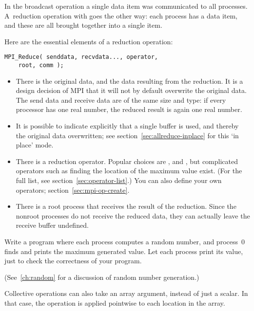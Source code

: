 In the broadcast operation a single data item was communicated to all
processes. A~reduction operation with
%
%
goes the other way: each process has a
data item, and these are all brought together into a single item.

Here are the essential elements of a reduction operation:
\begin{lstlisting}
MPI_Reduce( senddata, recvdata..., operator,
    root, comm ); 
\end{lstlisting}
\begin{itemize}
\item There is the original data, and the data resulting from the
  reduction. It is a design decision of MPI that it will not by
  default overwrite the original data. The send data and receive data
  are of the same size and type: if every processor has one real
  number, the reduced result is again one real number.
\item It is possible to indicate explicitly that a single buffer
  is used, and thereby the original data overwritten;
  see section~\ref{sec:allreduce-inplace} for this `in place' mode.
\item There is a reduction operator. Popular choices are
  ,  and
  , but complicated operators such as finding
  the location of the maximum value exist.
  (For the full list, see section~\ref{sec:operator-list}.)
  You can also define your
  own operators; section~\ref{sec:mpi-op-create}.
\item There is a root process that receives the result of the
  reduction. Since the nonroot processes do not receive the reduced
  data, they can actually leave the receive buffer undefined.
\end{itemize}


\begin{exercise}
  \label{ex:randommax}
  Write a program where each process computes a random number, and process~0
  finds and prints the maximum generated value. Let each process print its value,
  just to check the correctness of your program.
\begin{book}
  (See~\ref{ch:random} for a discussion of random number generation.)
\end{book}
\end{exercise}

Collective operations can also take an array argument, instead of just a scalar.
In that case, the operation is applied pointwise to each location in the array.

